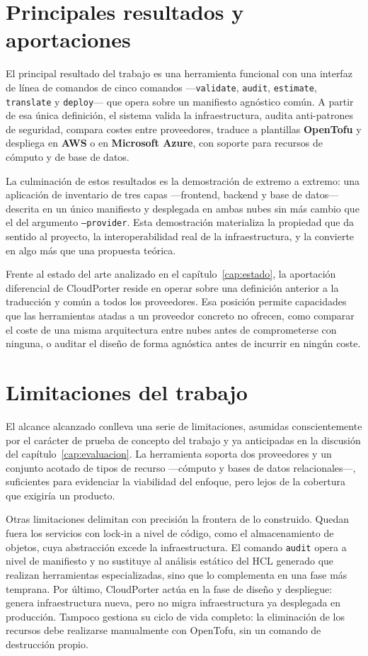 \section{Principales resultados y aportaciones}

El principal resultado del trabajo es una herramienta funcional con una interfaz de línea de comandos
de cinco comandos —\texttt{validate}, \texttt{audit}, \texttt{estimate}, \texttt{translate} y
\texttt{deploy}— que opera sobre un manifiesto agnóstico común. A partir de esa única definición, el
sistema valida la infraestructura, audita anti-patrones de seguridad, compara costes entre
proveedores, traduce a plantillas \textbf{OpenTofu} y despliega en \textbf{AWS} o en
\textbf{Microsoft Azure}, con soporte para recursos de cómputo y de base de datos.

La culminación de estos resultados es la demostración de extremo a extremo: una aplicación de
inventario de tres capas —frontend, backend y base de datos— descrita en un único manifiesto y
desplegada en ambas nubes sin más cambio que el del argumento \texttt{--provider}. Esta demostración
materializa la propiedad que da sentido al proyecto, la interoperabilidad real de la infraestructura,
y la convierte en algo más que una propuesta teórica.

Frente al estado del arte analizado en el capítulo~\ref{cap:estado}, la aportación diferencial de
CloudPorter reside en operar sobre una definición anterior a la traducción y común a todos los
proveedores. Esa posición permite capacidades que las herramientas atadas a un proveedor concreto no
ofrecen, como comparar el coste de una misma arquitectura entre nubes antes de comprometerse con
ninguna, o auditar el diseño de forma agnóstica antes de incurrir en ningún coste.

\section{Limitaciones del trabajo}

El alcance alcanzado conlleva una serie de limitaciones, asumidas conscientemente por el carácter de
prueba de concepto del trabajo y ya anticipadas en la discusión del capítulo~\ref{cap:evaluacion}. La
herramienta soporta dos proveedores y un conjunto acotado de tipos de recurso —cómputo y bases de
datos relacionales—, suficientes para evidenciar la viabilidad del enfoque, pero lejos de la cobertura
que exigiría un producto.

Otras limitaciones delimitan con precisión la frontera de lo construido. Quedan fuera los servicios con
lock-in a nivel de código, como el almacenamiento de objetos, cuya abstracción excede la infraestructura.
El comando \texttt{audit} opera a nivel de manifiesto y no sustituye al análisis estático del HCL
generado que realizan herramientas especializadas, sino que lo complementa en una fase más temprana.
Por último, CloudPorter actúa en la fase de diseño y despliegue: genera infraestructura nueva, pero no
migra infraestructura ya desplegada en producción. Tampoco gestiona su ciclo de vida completo: la
eliminación de los recursos debe realizarse manualmente con OpenTofu, sin un comando de destrucción
propio.

